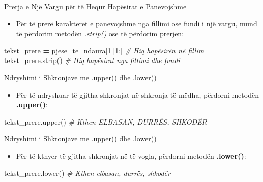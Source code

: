 \documentclass[
  ignorenonframetext,
]{beamer}
\newenvironment{Shaded}{\begin{snugshade}}{\end{snugshade}}
\newcommand{\CommentTok}[1]{\textcolor[rgb]{0.56,0.35,0.01}{\textit{#1}}}
\newcommand{\DecValTok}[1]{\textcolor[rgb]{0.00,0.00,0.81}{#1}}
\newcommand{\NormalTok}[1]{#1}
\newcommand{\OperatorTok}[1]{\textcolor[rgb]{0.81,0.36,0.00}{\textbf{#1}}}
\providecommand{\tightlist}{%
  \setlength{\itemsep}{0pt}\setlength{\parskip}{0pt}}
\begin{document}
\begin{frame}[fragile]{Prerja e Një Vargu për të Hequr Hapësirat e
Panevojshme}
\protect\hypertarget{prerja-e-njuxeb-vargu-puxebr-tuxeb-hequr-hapuxebsirat-e-panevojshme}{}
\begin{itemize}
\tightlist
\item
  Për të prerë karakteret e panevojshme nga fillimi ose fundi i një
  vargu, mund të përdorim metodën \emph{.strip()} ose të përdorim
  prerjen:
\end{itemize}

\begin{Shaded}
\begin{Highlighting}[]
\NormalTok{tekst\_prere }\OperatorTok{=}\NormalTok{ pjese\_te\_ndaura[}\DecValTok{1}\NormalTok{][}\DecValTok{1}\NormalTok{:]  }\CommentTok{\# Hiq hapësirën në fillim}
\NormalTok{tekst\_prere.strip()  }\CommentTok{\# Hiq hapësirat nga fillimi dhe fundi}
\end{Highlighting}
\end{Shaded}
\end{frame}

\begin{frame}[fragile]{Ndryshimi i Shkronjave me .upper() dhe .lower()}
\protect\hypertarget{ndryshimi-i-shkronjave-me-.upper-dhe-.lower}{}
\begin{itemize}
\tightlist
\item
  Për të ndryshuar të gjitha shkronjat në shkronja të mëdha, përdorni
  metodën \textbf{.upper()}:
\end{itemize}

\begin{Shaded}
\begin{Highlighting}[]
\NormalTok{tekst\_prere.upper()  }\CommentTok{\# Kthen \textquotesingle{}ELBASAN, DURRËS, SHKODËR\textquotesingle{}}
\end{Highlighting}
\end{Shaded}
\end{frame}

\begin{frame}[fragile]{Ndryshimi i Shkronjave me .upper() dhe .lower()}
\protect\hypertarget{ndryshimi-i-shkronjave-me-.upper-dhe-.lower-1}{}
\begin{itemize}
\tightlist
\item
  Për të kthyer të gjitha shkronjat në të vogla, përdorni metodën
  \textbf{.lower()}:
\end{itemize}

\begin{Shaded}
\begin{Highlighting}[]
\NormalTok{tekst\_prere.lower()  }\CommentTok{\# Kthen \textquotesingle{}elbasan, durrës, shkodër\textquotesingle{}}
\end{Highlighting}
\end{Shaded}
\end{frame}
\end{document}
